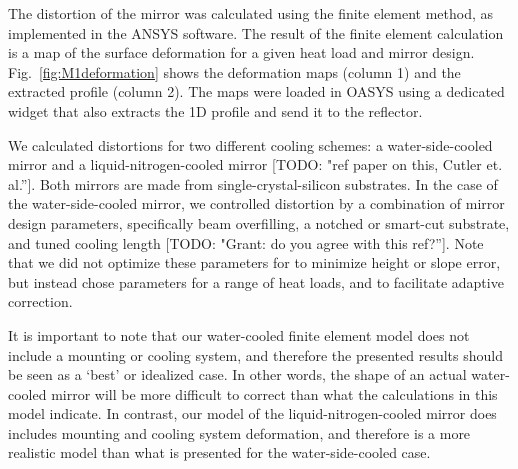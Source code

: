 \documentclass{iucr}              %
\newcommand{\todo}[1]{{\color{red}[TODO: "#1'']}}
\begin{document}
The distortion of the mirror was calculated using the finite element method, as implemented in the ANSYS software. The result of the finite element calculation is a map of the surface deformation for a given heat load and mirror design. Fig.~\ref{fig:M1deformation} shows the deformation maps (column 1) and the extracted profile (column 2). The maps were loaded in OASYS using a dedicated widget that also extracts the 1D profile and send it to the reflector.

We calculated distortions for two different cooling schemes: a water-side-cooled mirror and a liquid-nitrogen-cooled mirror \todo{ref paper on this, Cutler et. al.}. Both mirrors are made from single-crystal-silicon substrates. In the case of the water-side-cooled mirror, we controlled distortion by a combination of mirror design parameters, specifically beam overfilling, a notched or smart-cut substrate, and tuned cooling length \cite{Zhang} \todo{Grant: do you agree with this ref?}.  Note that we did not optimize these parameters for to minimize height or slope error, but instead chose parameters for a range of heat loads, and to facilitate adaptive correction.

It is important to note that our water-cooled finite element model does not include a mounting or cooling system, and therefore the presented results should be seen as a `best' or idealized case.  In other words, the shape of an actual water-cooled mirror will be more difficult to correct than what the calculations in this model indicate. In contrast, our model of the liquid-nitrogen-cooled mirror does includes mounting and cooling system deformation, and therefore is a more realistic model than what is presented for the water-side-cooled case.
\end{document}
